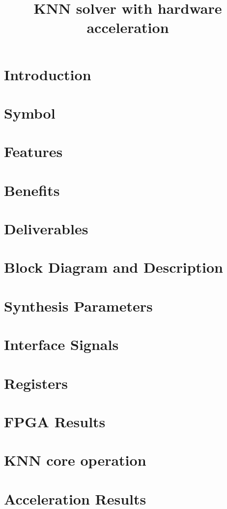 \documentclass{../../submodules/TEX/document/ug/ug}
\title{KNN solver with hardware acceleration}
\begin{document}
\maketitle
\cleardoublepage
\tableofcontents
\listoftables
\listoffigures
\cleardoublepage

\section{Introduction}


\section{Symbol}


\section{\textcolor[rgb]{0,0,0}{Features}}

\clearpage

\section{\textcolor[rgb]{0,0,0}{Benefits}}


\section{\textcolor[rgb]{0,0,0}{Deliverables}}

\clearpage

\section{\textcolor[rgb]{0,0,0}{Block Diagram and Description}}

\clearpage

\section{\textcolor[rgb]{0,0,0}{Synthesis Parameters}}


\section{Interface Signals}


\section{Registers}


\section{\textcolor[rgb]{0,0,0}{FPGA Results}}


\section{\textcolor[rgb]{0,0,0}{KNN core operation}}


\section{\textcolor[rgb]{0,0,0}{Acceleration Results}}



%
%
\end{document}
